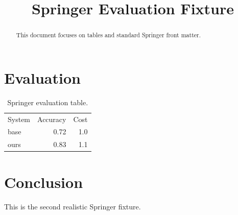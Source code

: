 \documentclass{springer}
\institute{Example Research Center}
\begin{document}
\title{Springer Evaluation Fixture}
\maketitle
\begin{abstract}
This document focuses on tables and standard Springer front matter.
\end{abstract}
\section{Evaluation}
\begin{table}[ht]
\centering
\begin{tabular}{lrr}
System & Accuracy & Cost\\
base & 0.72 & 1.0\\
ours & 0.83 & 1.1\\
\end{tabular}
\caption{Springer evaluation table.}
\end{table}
\section{Conclusion}
This is the second realistic Springer fixture.


\end{document}
